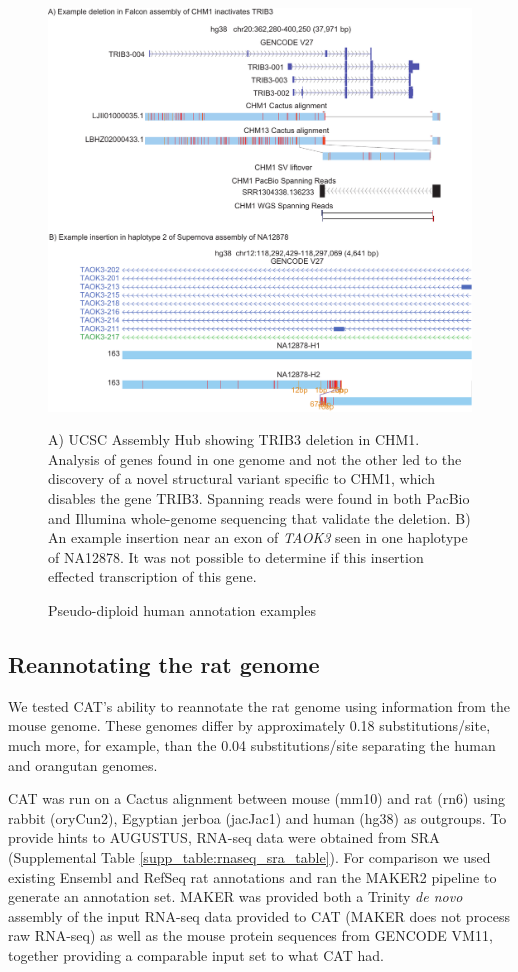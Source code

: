 \documentclass[fleqn,10pt]{wlscirep}
\begin{document}
\begin{figure}
\centering
\includegraphics[width=\textwidth,height=0.75\textheight,keepaspectratio]{human-examples.pdf}
\caption{Pseudo-diploid human annotation examples}
A) UCSC Assembly Hub\cite{nguyen2014comparative} showing TRIB3 deletion in CHM1. Analysis of genes found in one genome and not the other led to the discovery of a novel structural variant specific to CHM1, which disables the gene TRIB3. Spanning reads were found in both PacBio and Illumina whole-genome sequencing that validate the deletion. B) An example insertion near an exon of \textit{TAOK3} seen in one haplotype of NA12878. It was not possible to determine if this insertion effected transcription of this gene.
\label{fig:human_example}
\end{figure}

\subsection*{Reannotating the rat genome}

We tested CAT's ability to reannotate the rat genome using information from the mouse genome. These genomes differ by approximately 0.18 substitutions/site, much more, for example, than the 0.04 substitutions/site separating the human and orangutan genomes\cite{karolchik2003ucsc}.

CAT was run on a Cactus alignment between mouse (mm10) and rat (rn6) using rabbit (oryCun2), Egyptian jerboa (jacJac1) and human (hg38) as outgroups. To provide hints to AUGUSTUS, RNA-seq data were obtained from SRA \cite{fushan2015gene,cortez2014origins,liu2016identification} (Supplemental Table \ref{supp_table:rnaseq_sra_table}). For comparison we used existing Ensembl and RefSeq rat annotations and ran the MAKER2 pipeline \cite{cantarel2008maker} to generate an annotation set. MAKER was provided both a Trinity \cite{haas2013novo} \textit{de novo} assembly of the input RNA-seq data provided to CAT (MAKER does not process raw RNA-seq) as well as the mouse protein sequences from GENCODE VM11, together providing a comparable input set to what CAT had. 
  
\end{document}
